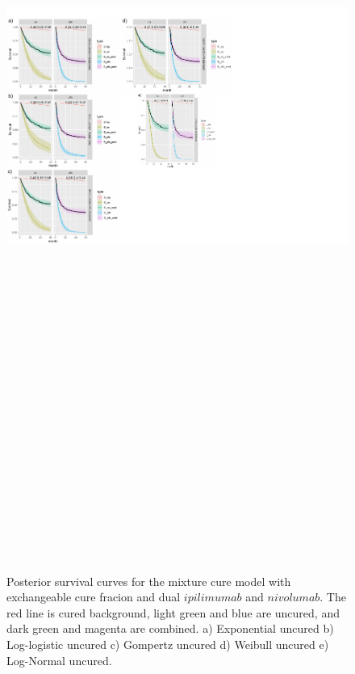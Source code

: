 \documentclass[
]{article}
\begin{document}
\begin{figure}

{\centering \includegraphics[width=25cm,height=40cm]{Check_mate_analysis_files/figure-latex/unnamed-chunk-10-1} 

}

\caption{\label{fig:NIVO+IPI}Posterior survival curves for the mixture cure model with exchangeable cure fracion and dual $ipilimumab$ and $nivolumab$. The red line is cured background, light green and blue are uncured, and dark green and magenta are combined. a) Exponential uncured b) Log-logistic uncured c) Gompertz uncured d) Weibull uncured e) Log-Normal uncured.}\label{fig:unnamed-chunk-10}
\end{figure}
\end{document}
